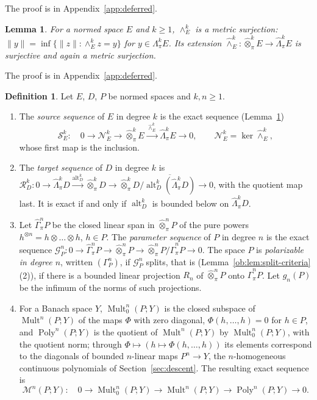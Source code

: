 \documentclass[11pt]{amsart}
\newtheorem{lemma}[theorem]{Lemma}
\theoremstyle{definition}
\newtheorem{definition}[theorem]{Definition}
\theoremstyle{remark}
\numberwithin{equation}{section}
\newcommand{\Mult}{\operatorname{Mult}}
\newcommand{\norm}[1]{\lVert #1\rVert}
\theoremstyle{plain}
\theoremstyle{definition}
\theoremstyle{plain}
\newcommand{\alt}{\operatorname{alt}}
\newcommand{\Poly}{\operatorname{Poly}}
\newcommand{\cN}{\mathcal N}
\newcommand{\cS}{\mathcal S}
\newcommand{\cR}{\mathcal R}
\newcommand{\cG}{\mathcal G}
\newcommand{\cM}{\mathcal M}
\begin{document}
The proof is in Appendix~\ref{app:deferred}.

\begin{lemma}\label{ob:lem:metric-surjection}
For a normed space $E$ and $k\ge1$, $\wedge^k_E$ is a metric surjection: $\norm y=\inf\{\norm z:\wedge^k_Ez=y\}$ for
$y\in\Lambda^k_\pi E$. Its extension $\widehat\wedge^k_E\colon\widehat\otimes^k_\pi E\to\widehat\Lambda^k_\pi E$ is
surjective and again a metric surjection.
\end{lemma}

The proof is in Appendix~\ref{app:deferred}.

\begin{definition}\label{ob:def:sequences}
Let $E$, $D$, $P$ be normed spaces and $k,n\ge1$.
\begin{enumerate}
\item The \emph{source sequence} of $E$ in degree $k$ is the exact sequence (Lemma~\ref{ob:lem:metric-surjection})
\begin{equation}\label{ob:eq:source}
 \cS^k_E\colon\quad0\to\cN^k_E\to\widehat\otimes^k_\pi E\xrightarrow{\;\widehat\wedge^k_E\;}\widehat\Lambda^k_\pi E\to0,
 \qquad \cN^k_E=\ker\widehat\wedge^k_E,
\end{equation}
whose first map is the inclusion.
\item The \emph{target sequence} of $D$ in degree $k$ is
$\cR^k_D\colon0\to\widehat\Lambda^k_\pi D\xrightarrow{\alt^k_D}\widehat\otimes^k_\pi D\to
\widehat\otimes^k_\pi D/\overline{\alt^k_D(\widehat\Lambda^k_\pi D)}\to0$, with the quotient map last. It is exact if and
only if $\alt^k_D$ is bounded below on $\widehat\Lambda^k_\pi D$.
\item Let $\widehat\Gamma^n_\pi P$ be the closed linear span in $\widehat\otimes^n_\pi P$ of the pure powers
$h^{\otimes n}=h\otimes\dots\otimes h$, $h\in P$. The \emph{parameter sequence} of $P$ in degree $n$ is the exact sequence
$\cG^n_P\colon0\to\widehat\Gamma^n_\pi P\to\widehat\otimes^n_\pi P\to\widehat\otimes^n_\pi P/\widehat\Gamma^n_\pi P\to0$.
The space $P$ is \emph{polarizable in degree $n$}, written $(\Gamma^n_P)$, if $\cG^n_P$ splits, that is
(Lemma~\ref{ob:lem:split-criteria}(2)), if there is a bounded linear projection $R_n$ of $\widehat\otimes^n_\pi P$ onto
$\widehat\Gamma^n_\pi P$. Let $g_n(P)$ be the infimum of the norms of such projections.
\item For a Banach space $Y$, $\Mult^n_0(P;Y)$ is the closed subspace of $\Mult^n(P;Y)$ of the maps $\Phi$ with zero
diagonal, $\Phi(h,\dots,h)=0$ for $h\in P$, and $\Poly^n(P;Y)$ is the quotient of $\Mult^n(P;Y)$ by $\Mult^n_0(P;Y)$,
with the quotient norm; through $\Phi\mapsto(h\mapsto\Phi(h,\dots,h))$ its elements correspond to the diagonals of bounded
$n$-linear maps $P^n\to Y$, the $n$-homogeneous continuous polynomials of Section~\ref{sec:descent}. The resulting exact sequence is
\[
 \cM^n(P;Y)\colon\quad0\to\Mult^n_0(P;Y)\to\Mult^n(P;Y)\to\Poly^n(P;Y)\to0.
\]
\end{enumerate}
\end{definition}
\end{document}
